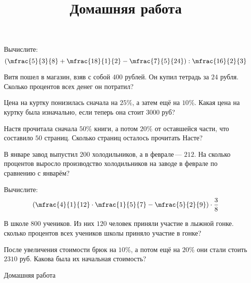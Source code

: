 \begin{homework}[number=3]
	\begin{listofex}
		\item 
	\end{listofex}
\end{homework}

\begin{class}[number=5]
	\begin{listofex}
		\item Вычислите:
		\[\left( \mfrac{5}{3}{8}+\mfrac{18}{1}{2}-\mfrac{7}{5}{24} \right):\mfrac{16}{2}{3}\]
		\item Витя пошел в магазин, взяв с собой \( 400 \) рублей. Он купил тетрадь за \( 24 \) рубля. Сколько процентов всех денег он потратил?
		\item Цена на куртку понизилась сначала на \( 25\% \), а затем ещё на \( 10\% \). Какая цена на куртку была изначально, если теперь она стоит \( 3000 \) руб?
		\item Настя прочитала сначала \( 50\% \) книги, а потом \( 20\% \) от оставшейся части, что составило \( 50 \) страниц. Сколько страниц осталось прочитать Насте?
		\item В январе завод выпустил \( 200 \) холодильников, а в феврале --- \( 212 \). На сколько процентов выросло производство холодильников на заводе в феврале по сравнению с январём?
	\end{listofex}
		\newpage
		\title{Домашняя работа}
		\begin{listofex}
		\item Вычислите:
		\[\left( \mfrac{4}{1}{12}\cdot\mfrac{1}{5}{7}-\mfrac{5}{2}{9} \right)\cdot\dfrac{3}{8}\]
		\item В школе \( 800 \) учеников. Из них \( 120 \) человек приняли участие в лыжной гонке. сколько процентов всех учеников школы приняло участие в гонке?
		\item После увеличения стоимости брюк на \( 10\% \), а потом ещё на \( 20\% \) они стали стоить \( 2310 \) руб. Какова была их начальная стоимость?
		\end{listofex}
\end{class}

\begin{homework}[number=2]
	\begin{listofex}
		\item Домашняя работа
	\end{listofex}
\end{homework}

